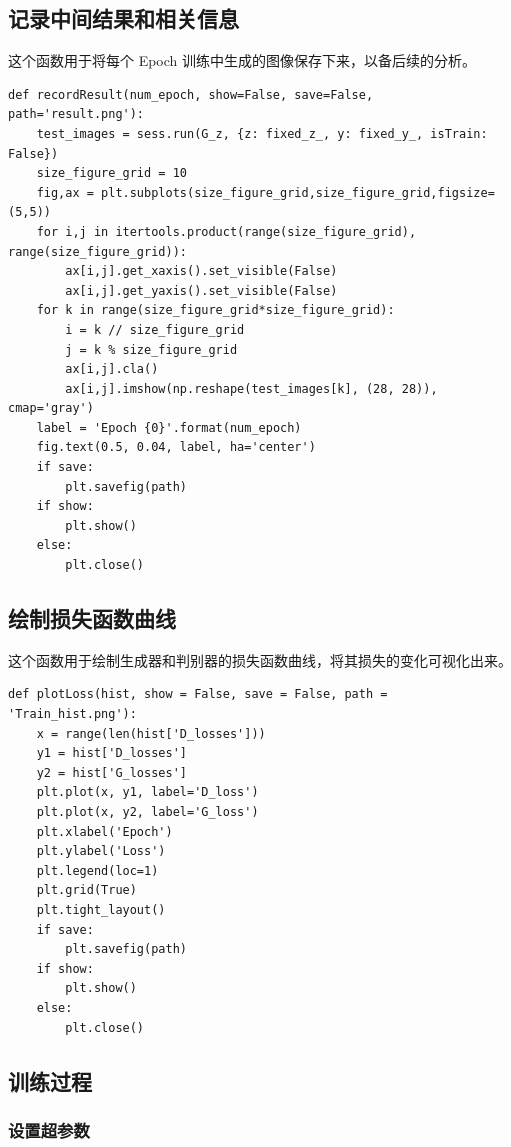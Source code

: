 \documentclass[a4paper, 12pt]{article}
\begin{document}
\subsection{记录中间结果和相关信息}

这个函数用于将每个 Epoch 训练中生成的图像保存下来，以备后续的分析。

\begin{lstlisting}[style=myPython,caption={记录中间结果和相关信息}]
def recordResult(num_epoch, show=False, save=False, path='result.png'):
    test_images = sess.run(G_z, {z: fixed_z_, y: fixed_y_, isTrain: False})
    size_figure_grid = 10
    fig,ax = plt.subplots(size_figure_grid,size_figure_grid,figsize=(5,5))
    for i,j in itertools.product(range(size_figure_grid), range(size_figure_grid)):
        ax[i,j].get_xaxis().set_visible(False)
        ax[i,j].get_yaxis().set_visible(False)
    for k in range(size_figure_grid*size_figure_grid):
        i = k // size_figure_grid
        j = k % size_figure_grid
        ax[i,j].cla()
        ax[i,j].imshow(np.reshape(test_images[k], (28, 28)), cmap='gray')
    label = 'Epoch {0}'.format(num_epoch)
    fig.text(0.5, 0.04, label, ha='center')
    if save:
        plt.savefig(path)
    if show:
        plt.show()
    else:
        plt.close()
\end{lstlisting}

\subsection{绘制损失函数曲线}

这个函数用于绘制生成器和判别器的损失函数曲线，将其损失的变化可视化出来。

\begin{lstlisting}[style=myPython,caption={绘制损失函数曲线}]
def plotLoss(hist, show = False, save = False, path = 'Train_hist.png'):
    x = range(len(hist['D_losses']))
    y1 = hist['D_losses']
    y2 = hist['G_losses']
    plt.plot(x, y1, label='D_loss')
    plt.plot(x, y2, label='G_loss')
    plt.xlabel('Epoch')
    plt.ylabel('Loss')
    plt.legend(loc=1)
    plt.grid(True)
    plt.tight_layout()
    if save:
        plt.savefig(path)
    if show:
        plt.show()
    else:
        plt.close()
\end{lstlisting}

\subsection{训练过程}

\subsubsection{设置超参数}
\end{document}
